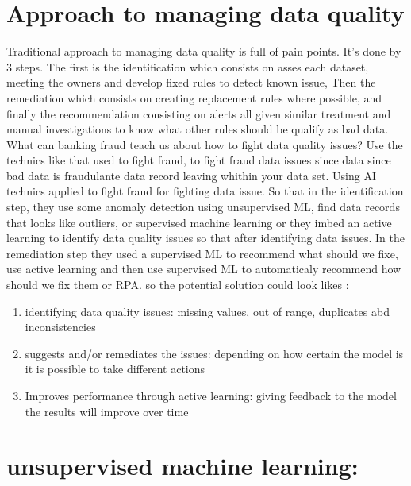 \documentclass{article}
\begin{document}
\section{Approach to managing data quality }
Traditional approach to managing data quality is full of pain points. It's done by 3 steps. The first is the identification which consists on asses each dataset, meeting the owners and develop fixed rules to detect known issue, Then the remediation which consists on creating replacement rules where possible, and finally the recommendation consisting on alerts all given similar treatment and manual investigations to know what other rules should be qualify as bad data.
What can banking fraud teach us about how to fight data quality issues?
Use the technics like that used to fight fraud, to fight fraud data issues since data since bad data is fraudulante data record leaving whithin your data set.
Using AI technics applied to fight fraud for fighting data issue.
So that in the identification step, they use some anomaly detection using unsupervised ML, find data records that looks like outliers, or supervised machine learning or they imbed an active learning to identify data quality issues so that after identifying data issues. In the remediation step they used a supervised ML to recommend what should we fixe, use active learning and then use supervised ML to automaticaly recommend how should we fix them or RPA.
so the potential solution could look likes :
\begin{enumerate}
    \item identifying data quality issues: missing values, out of range, duplicates abd inconsistencies
    \item suggests and/or remediates the issues: depending on how certain the model is it is possible to take different actions
    \item Improves performance through active learning: giving feedback to the model the results will improve over time
\end{enumerate}
\section{unsupervised machine learning:}
\end{document}
